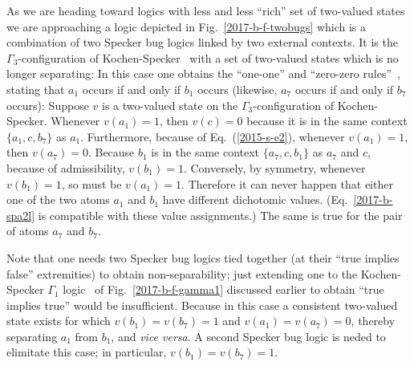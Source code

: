 \documentclass[%
  twocolumn,
 showpacs,
 showkeys,
 preprintnumbers,
 amsmath,amssymb,
 aps,
  pra,
  longbibliography,
 floatfix,
 ]{revtex4-1}
\begin{document}
As we are heading toward  logics with less and less ``rich'' set of two-valued states we are approaching
a logic   depicted in Fig.~\ref{2017-b-f-twobugs}
which is a combination of two Specker bug logics linked by two external contexts.
It is the $\Gamma_3$-configuration of Kochen-Specker~\cite[p.~70]{kochen1}
with a set of two-valued states which is no longer separating:
In this case one obtains the ``one-one'' and ``zero-zero rules''~\cite{svozil-2006-omni},
stating that  $a_1$ occurs if and only if $b_1$ occurs
(likewise, $a_7$ occurs if and only if $b_7$ occurs):
Suppose $v$ is a two-valued state on the $\Gamma_3$-configuration of Kochen-Specker.
Whenever $v(a_1)=1$, then $v(c)=0$ because it is in the same context $\{a_1,c,b_7\}$ as $a_1$.
Furthermore, because of Eq.~(\ref{2015-s-e2}), whenever $v(a_1)=1$, then $v(a_7)=0$.
Because $b_1$ is in the same context $\{a_7,c,b_1\}$ as $a_7$ and $c$, because of admissibility, $v(b_1)=1$.
Conversely, by symmetry, whenever $v(b_1)=1$, so must be $v(a_1)=1$.
Therefore it can never happen that either one of the two atoms $a_1$ and $b_1$ have different dichotomic values.
(Eq.~\ref{2017-b-spa2l} is compatible with these value assignments.)
The same is true for the pair of atoms  $a_7$ and $b_7$.

Note that one needs two Specker bug logics tied together (at their ``true implies false'' extremities)
to obtain non-separability;
just extending one to the
Kochen-Specker $\Gamma_1$ logic~\cite[p.~68]{kochen1} of Fig.~\ref{2017-b-f-gamma1}
discussed earlier to obtain ``true implies true'' would be insufficient.
Because in this case a consistent two-valued state exists for which $v(b_1)=v(b_7)=1$ and $v(a_1)=v(a_7)=0$,
thereby separating $a_1$ from $b_1$, and {\it vice versa}.
A second Specker bug logic is neded to elimitate this case; in particular, $v(b_1)=v(b_7)=1$.
\end{document}
